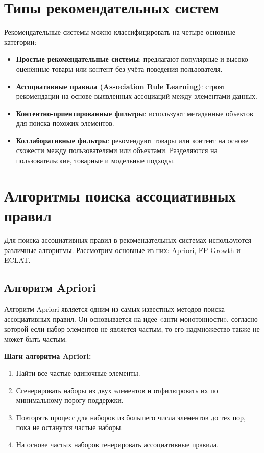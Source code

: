 \documentclass[a4paper,12pt]{article}
\begin{document}
\section{Типы рекомендательных систем}

Рекомендательные системы можно классифицировать на четыре основные категории:

\begin{itemize}
    \item \textbf{Простые рекомендательные системы}: предлагают популярные и высоко оценённые товары или контент без учёта поведения пользователя.
    \item \textbf{Ассоциативные правила (Association Rule Learning)}: строят рекомендации на основе выявленных ассоциаций между элементами данных.
    \item \textbf{Контентно-ориентированные фильтры}: используют метаданные объектов для поиска похожих элементов.
    \item \textbf{Коллаборативные фильтры}: рекомендуют товары или контент на основе схожести между пользователями или объектами. Разделяются на пользовательские, товарные и модельные подходы.
\end{itemize}

\section{Алгоритмы поиска ассоциативных правил}

Для поиска ассоциативных правил в рекомендательных системах используются различные алгоритмы. Рассмотрим основные из них: Apriori, FP-Growth и ECLAT.

\subsection{Алгоритм Apriori}

Алгоритм Apriori является одним из самых известных методов поиска ассоциативных правил. Он основывается на идее «анти-монотонности», согласно которой если набор элементов не является частым, то его надмножество также не может быть частым.

\textbf{Шаги алгоритма Apriori:}
\begin{enumerate}
    \item Найти все частые одиночные элементы.
    \item Сгенерировать наборы из двух элементов и отфильтровать их по минимальному порогу поддержки.
    \item Повторять процесс для наборов из большего числа элементов до тех пор, пока не останутся частые наборы.
    \item На основе частых наборов генерировать ассоциативные правила.
\end{enumerate}
\end{document}
